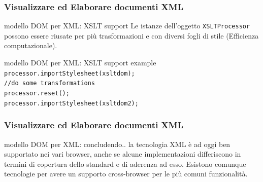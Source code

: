 \begin{frame}
    \frametitle{Visualizzare ed Elaborare documenti XML}
    \addtocounter{nframe}{1}
    

    \begin{block}{modello DOM per XML: XSLT support}
        Le istanze dell'oggetto \texttt{XSLTProcessor} possono essere riusate per più trasformazioni e con diversi fogli di stile (Efficienza computazionale).
    \end{block}

    \begin{block}{modello DOM per XML: XSLT support example}
        \texttt{processor.importStylesheet(xsltdom); }
        \\\texttt{//do some transformations }
        \\\texttt{processor.reset(); }
        \\\texttt{processor.importStylesheet(xsltdom2); }
    \end{block}
     
\end{frame}

\begin{frame}
    \frametitle{Visualizzare ed Elaborare documenti XML}
    \addtocounter{nframe}{1}
    

    \begin{block}{modello DOM per XML: concludendo..}
       la tecnologia XML è ad oggi ben supportato nei vari browser, anche se alcune implementazioni differiscono in termini di copertura dello standard e di aderenza ad esso. Esistono comunque tecnologie per avere un supporto cross-browser per le più comuni funzionalità.
    \end{block}
     
\end{frame}



